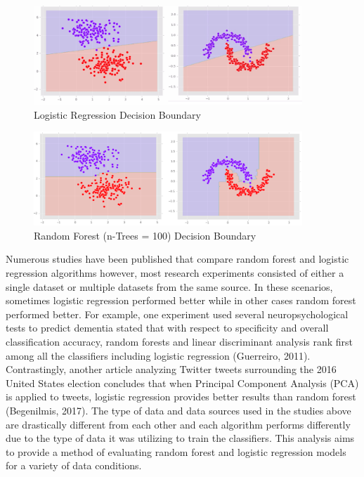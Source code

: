 \documentclass{llncs}
\begin{document}
\begin{figure}
\centering
\includegraphics[width=0.9\textwidth]{decisionboundary.png}
\caption{Logistic Regression Decision Boundary}
\label{fig:boundary1}
\end{figure}

\begin{figure}
\centering
\includegraphics[width=0.9\textwidth]{decisionboundary2.png}
\caption{Random Forest (n-Trees = 100) Decision Boundary}
\label{fig:boundary2}
\end{figure}


Numerous studies have been published that compare random forest and logistic regression algorithms however, most research experiments consisted of either a single dataset or multiple datasets from the same source. In these scenarios, sometimes logistic regression performed better while in other cases random forest performed better. For example, one experiment used several neuropsychological tests to predict dementia stated that with respect to specificity and overall classification accuracy, random forests and linear discriminant analysis rank first among all the classifiers including logistic regression (Guerreiro, 2011). Contrastingly, another article analyzing Twitter tweets surrounding the 2016 United States election concludes that when Principal Component Analysis (PCA) is applied to tweets, logistic regression provides better results than random forest (Begenilmis, 2017). The type of data and data sources used in the studies above are drastically different from each other and each algorithm performs differently due to the type of data it was utilizing to train the classifiers. This analysis aims to provide a method of evaluating random forest and logistic regression models for a variety of data conditions.
\end{document}
